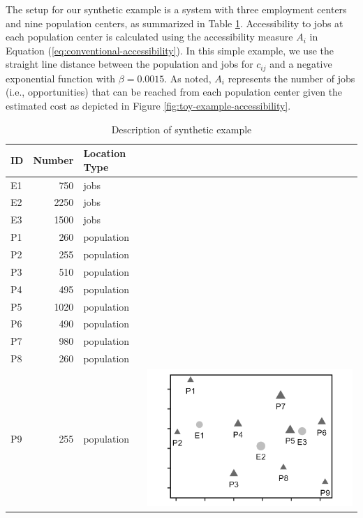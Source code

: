 \documentclass[]{elsarticle} %
\begin{document}
The setup for our synthetic example is a system with three employment
centers and nine population centers, as summarized in Table
\ref{tab:toy-example}. Accessibility to jobs at each population center
is calculated using the accessibility measure \(A_i\) in Equation
(\ref{eq:conventional-accessibility}). In this simple example, we use
the straight line distance between the population and jobs for
\(c_{ij}\) and a negative exponential function with \(\beta = 0.0015\).
As noted, \(A_i\) represents the number of jobs (i.e., opportunities)
that can be reached from each population center given the estimated cost
as depicted in Figure \ref{fig:toy-example-accessibility}.

\begin{table}

\caption{\label{tab:toy-example-table}\label{tab:toy-example}Description of synthetic example}
\centering
\begin{tabular}[t]{lrl>{}l}
\toprule
ID & Number & Location Type &  \\
\midrule
E1 & 750 & jobs & \\

E2 & 2250 & jobs & \\

E3 & 1500 & jobs & \\

P1 & 260 & population & \\

P2 & 255 & population & \\

P3 & 510 & population & \\

P4 & 495 & population & \\

P5 & 1020 & population & \\

P6 & 490 & population & \\

P7 & 980 & population & \\

P8 & 260 & population & \\

P9 & 255 & population & \multirow{-12}{*}{\raggedright\arraybackslash \includegraphics{images/figure-1.png}}\\
\bottomrule
\end{tabular}
\end{table}
\end{document}
